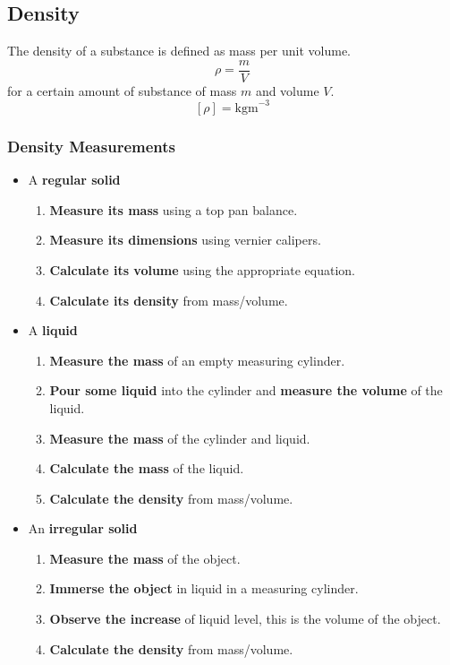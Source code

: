 \subsection{Density}

The density of a substance is defined as mass per unit volume.
$$\rho=\frac{m}{V}$$
for a certain amount of substance of mass $m$ and volume $V$.
$$[\rho]=\text{kgm}^{-3}$$

\subsubsection*{Density Measurements}

\begin{itemize}
    \item A \textbf{regular solid}
        \begin{enumerate}
            \item \textbf{Measure its mass} using a top pan balance.
            \item \textbf{Measure its dimensions} using vernier calipers.
            \item \textbf{Calculate its volume} using the appropriate equation.
            \item \textbf{Calculate its density} from mass/volume.
        \end{enumerate}
    \item A \textbf{liquid}
        \begin{enumerate}
            \item \textbf{Measure the mass} of an empty measuring cylinder.
            \item \textbf{Pour some liquid} into the cylinder and \textbf{measure the volume} of the liquid.
            \item \textbf{Measure the mass} of the cylinder and liquid.
            \item \textbf{Calculate the mass} of the liquid.
            \item \textbf{Calculate the density} from mass/volume.
        \end{enumerate}
    \item An \textbf{irregular solid}
        \begin{enumerate}
            \item \textbf{Measure the mass} of the object.
            \item \textbf{Immerse the object} in liquid in a measuring cylinder.
            \item \textbf{Observe the increase} of liquid level, this is the volume of the object.
            \item \textbf{Calculate the density} from mass/volume.
        \end{enumerate}
\end{itemize}

